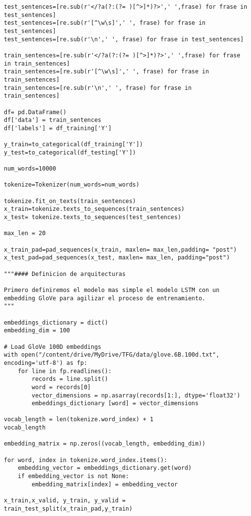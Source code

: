 \documentclass[10pt,riqno,a4paper,twoside]{article}\usepackage[]{graphicx}\usepackage[]{color}
\begin{document}
\begin{lstlisting}
test_sentences=[re.sub(r'</?a(?:(?= )[^>]*)?>',' ',frase) for frase in test_sentences]
test_sentences=[re.sub(r'[^\w\s]',' ', frase) for frase in test_sentences] 
test_sentences=[re.sub(r'\n',' ', frase) for frase in test_sentences] 

train_sentences=[re.sub(r'</?a(?:(?= )[^>]*)?>',' ',frase) for frase in train_sentences]
train_sentences=[re.sub(r'[^\w\s]',' ', frase) for frase in train_sentences] 
train_sentences=[re.sub(r'\n',' ', frase) for frase in train_sentences]

df= pd.DataFrame()
df['data'] = train_sentences
df['labels'] = df_training['Y']

y_train=to_categorical(df_training['Y'])
y_test=to_categorical(df_testing['Y'])

num_words=10000

tokenize=Tokenizer(num_words=num_words)

tokenize.fit_on_texts(train_sentences)
x_train=tokenize.texts_to_sequences(train_sentences)
x_test= tokenize.texts_to_sequences(test_sentences)

max_len = 20

x_train_pad=pad_sequences(x_train, maxlen= max_len,padding= "post")
x_test_pad=pad_sequences(x_test, maxlen= max_len, padding="post")

"""#### Definicion de arquitecturas

Primero definiremos el modelo mas simple el modelo LSTM con un embedding GloVe para agilizar el proceso de entrenamiento.
"""

embeddings_dictionary = dict()
embedding_dim = 100

# Load GloVe 100D embeddings
with open("/content/drive/MyDrive/TFG/data/glove.6B.100d.txt", encoding='utf-8') as fp:
    for line in fp.readlines():
        records = line.split()
        word = records[0]
        vector_dimensions = np.asarray(records[1:], dtype='float32')
        embeddings_dictionary [word] = vector_dimensions

vocab_length = len(tokenize.word_index) + 1
vocab_length

embedding_matrix = np.zeros((vocab_length, embedding_dim))

for word, index in tokenize.word_index.items():
    embedding_vector = embeddings_dictionary.get(word)
    if embedding_vector is not None:
        embedding_matrix[index] = embedding_vector

x_train,x_valid, y_train, y_valid = train_test_split(x_train_pad,y_train)


\end{lstlisting}
\end{document}
